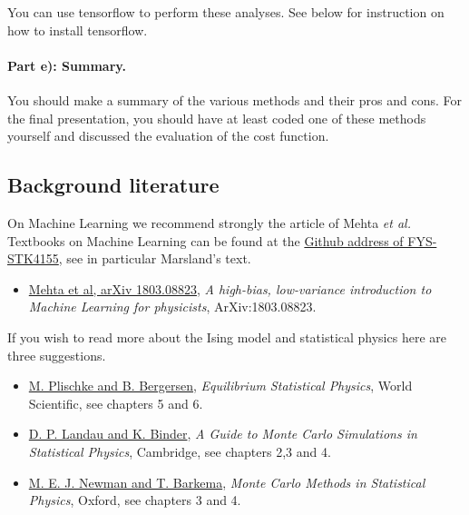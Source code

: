 \documentclass[%
oneside,                 %
final,                   %
10pt]{article}
\begin{document}
You can use tensorflow  to perform these analyses. See below for instruction on how to install tensorflow.


\paragraph{Part e):  Summary.}
You should make a summary of the various methods and their pros and cons. For the final presentation, you should have at least coded one of these methods yourself and discussed the evaluation of the cost function. 

\subsection{Background literature}

On Machine Learning we recommend strongly the article of Mehta \emph{et al.}
Textbooks on Machine Learning can be found at the \href{{https://github.com/CompPhysics/MachineLearning/tree/master/doc/Textbooks}}{Github address of FYS-STK4155}, see in particular Marsland's text. 

\begin{itemize}
  \item \href{{https://arxiv.org/abs/1803.08823}}{Mehta et al, arXiv 1803.08823}, \emph{A high-bias, low-variance introduction to Machine Learning for physicists}, ArXiv:1803.08823.
\end{itemize}

\noindent
If you wish to read more about the Ising model and statistical physics here are three suggestions.

\begin{itemize}
  \item \href{{http://www.worldscientific.com/worldscibooks/10.1142/5660}}{M. Plischke and B. Bergersen}, \emph{Equilibrium Statistical Physics}, World Scientific, see chapters 5 and 6.

  \item \href{{http://www.cambridge.org/no/academic/subjects/physics/computational-science-and-modelling/guide-monte-carlo-simulations-statistical-physics-4th-edition?format=HB}}{D. P. Landau and K. Binder}, \emph{A Guide to Monte Carlo Simulations in Statistical Physics}, Cambridge, see chapters 2,3 and 4.

  \item \href{{https://global.oup.com/academic/product/monte-carlo-methods-in-statistical-physics-9780198517979?cc=no&lang=en&}}{M. E. J. Newman and T. Barkema}, \emph{Monte Carlo Methods in Statistical Physics}, Oxford, see chapters 3 and 4.
\end{itemize}
\end{document}
